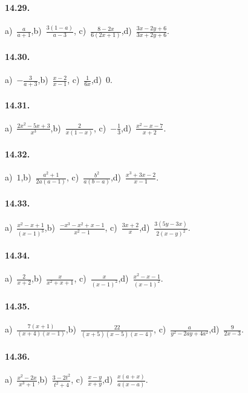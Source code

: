 \paragraph{14.29.}
a)~$\frac{a}{a+1}$,\quad b)~$\frac{3(1-a)}{a-3}$, \quad c)~$\frac{8-2x}{6(2x+1)}$,\quad d)~$\frac{3x-2y+6}{3x+2y+6}$.

\paragraph{14.30.}
a)~$-\frac{3}{a+3}$,\quad b)~$\frac{x-2}{x-1}$, \quad c)~$\frac{1}{6x}$,\quad d)~$0$.

\paragraph{14.31.}
a)~$\frac{2x^{2}-5x+3}{x^{3}}$,\quad b)~$\frac{2}{x(1-x)}$, \quad c)~$-{\frac{1}{3}}$,\quad d)~$\frac{x^{2}-x-7}{x+2}$.

\paragraph{14.32.}
a)~$1$,\quad b)~$\frac{a^{2}+1}{2a(a-1)}$, \quad c)~$\frac{b^{2}}{a(b-a)}$,\quad d)~$\frac{x^{3}+3x-2}{x-1}$.

\paragraph{14.33.}
a)~$\frac{x^{2}-x+1}{(x-1)^{3}}$,\quad b)~$\frac{-x^{3}-x^{2}+x-1}{x^{2}-1}$, \quad c)~$\frac{3x+2}{x}$,\quad d)~$\frac{3(5y-3x)}{2(x-y)^{2}}$.

\paragraph{14.34.}
a)~$\frac{2}{x+2}$,\quad b)~$\frac{x}{x^{2}+x+1}$, \quad c)~$\frac{x}{(x-1)^{2}}$,\quad d)~$\frac{x^{2}-x-1}{(x-1)^{2}}$.

\paragraph{14.35.}
a)~$\frac{7(x+1)}{(x+4)(x-1)}$,\quad b)~$\frac{22}{(x+5)(x-5)(x-4)}$, \quad c)~$\frac{a}{y^{2}-2ay+4a^{2}}$,\quad d)~$\frac{9}{2x-3}$.

\paragraph{14.36.}
a)~$\frac{x^{2}-2x}{x^{3}+1}$,\quad b)~$\frac{3-2t^{2}}{t^{2}+4}$, \quad c)~$\frac{x-y}{x+y}$,\quad d)~$\frac{x(a+x)}{a(x-a)}$.

